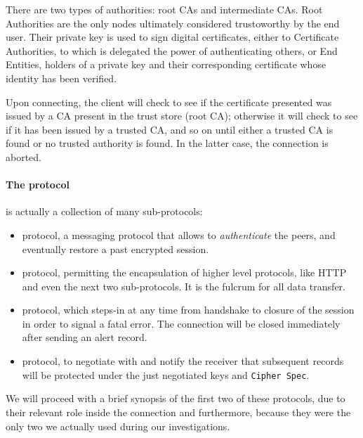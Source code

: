 There are two types of authorities: root CAs and intermediate CAs. Root
Authorities are the only nodes ultimately considered trustoworthy by the end
user. Their private key is used to sign digital certificates, either to
Certificate Authorities, to which is delegated the power of authenticating
others, or End Entities, holders of a private key and their corresponding
certificate whose identity has been verified.

Upon connecting, the client will check to see if the certificate presented was issued
by a CA present in the trust store (root CA); otherwise it will check to see if
it has been issued by a trusted CA, and so on until either a trusted CA is
found or no trusted authority is found. In the latter case, the connection is aborted.

\paragraph{The protocol} is actually a collection of many sub-protocols:
\begin{itemize}
  \setlength{\itemsep}{1pt}
  \setlength{\parskip}{0pt}
  \setlength{\parsep}{0pt}
\item {} protocol, a messaging protocol that allows to
  \emph{authenticate} the peers, and eventually restore a past encrypted
  session.
\item {} protocol, permitting the encapsulation of higher level protocols,
  like HTTP and even the next two sub-protocols. It is the fulcrum for all data
  transfer.
\item {} protocol, which steps-in at any time from handshake to closure of the
  session in order to signal a fatal error. The connection will be closed
  immediately after sending an alert record.
\item {} protocol, to negotiate with and notify  the receiver that
  subsequent records will be protected under the just negotiated keys and
  \texttt{Cipher Spec}.
\end{itemize}
We will proceed with a brief synopsis of the first two of these protocols, due to
their relevant role inside the connection and furthermore, because they were the
only two we actually used during our investigations.


